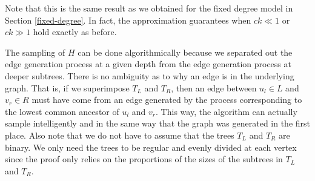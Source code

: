 %
%

Note that this is the same result as we obtained for the fixed degree
model in Section \ref{fixed-degree}. In fact, the approximation
guarantees when $ck \ll 1$ or $ck \gg 1$ hold exactly as before.\vs

The sampling of $H$ can be done algorithmically because we separated
out the edge generation process at a given depth from the edge
generation process at deeper subtrees. There is no ambiguity as to why
an edge is in the underlying graph. That is, if we superimpose $T_L$
and $T_R$, then an edge between $u_l\in L$ and $v_r\in R$ must have
come from an edge generated by the process corresponding to the lowest common ancestor of $u_l$ and $v_r$. This way, the algorithm can actually sample intelligently and in the same way that the graph was generated in the first place. Also note
that we do not have to assume that the trees $T_L$ and $T_R$ are
binary. We only need the trees to be regular and evenly divided at
each vertex since the proof only relies on the proportions of the
sizes of the subtrees in $T_L$ and $T_R$.


